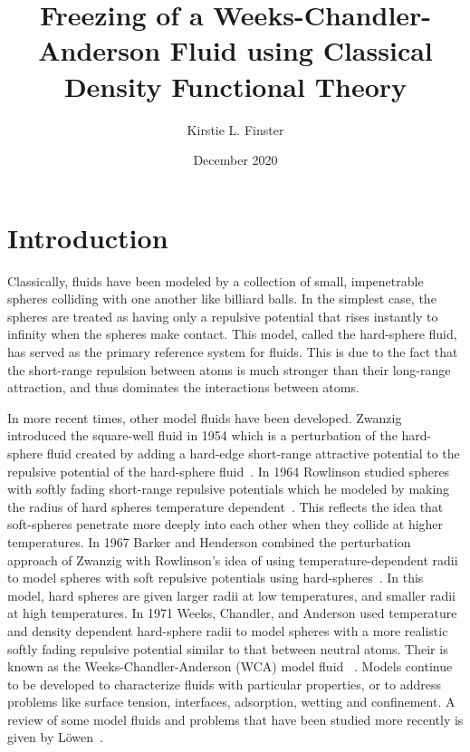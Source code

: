 \documentclass[double,12pt]{beavtex}
\title{Freezing of a Weeks-Chandler-Anderson Fluid using Classical Density Functional Theory}
\author{Kirstie L. Finster}
\date{December 2020}
\begin{document}
   \maketitle
   \mainmatter

\chapter{Introduction}

Classically, fluids have been modeled by a collection of small, 
impenetrable spheres colliding with one another like billiard balls. 
In the simplest case, the spheres are treated as having only a repulsive 
potential that rises instantly to infinity when the spheres make contact. 
This model, called the hard-sphere fluid, has served as the 
primary reference system for fluids. This is due to the fact that the 
short-range repulsion between atoms is much stronger than their long-range 
attraction, and thus dominates the interactions between atoms. 

In more recent times, other model fluids have been developed.
Zwanzig introduced the square-well 
fluid in 1954 which is a perturbation of the hard-sphere fluid created by adding 
a hard-edge short-range attractive potential to the repulsive potential of the 
hard-sphere fluid~\cite{ZwanzigSqrWell}. In 1964 Rowlinson studied 
spheres with softly fading short-range repulsive potentials which he modeled by making
the radius of hard spheres temperature dependent~\cite{rowlinson1964statistical}. 
This reflects the idea that soft-spheres penetrate more deeply into 
each other when they collide at higher temperatures. 
In 1967 Barker and Henderson combined the perturbation approach of Zwanzig 
with Rowlinson's idea of using temperature-dependent radii to model spheres 
with soft repulsive potentials using hard-spheres~\cite{barker1967perturbation}. 
In this model, 
hard spheres are given larger radii 
at low temperatures, and smaller radii at high temperatures. 
In 1971 Weeks, 
Chandler, and Anderson used temperature and density dependent hard-sphere 
radii to model spheres with a more realistic softly fading repulsive 
potential similar to that between neutral atoms.
Their is known as the Weeks-Chandler-Anderson (WCA) model fluid~\cite{andersen1971relationship} . 
Models continue to be developed to characterize fluids with particular 
properties, or to address problems like surface tension, 
interfaces, adsorption, wetting and confinement.
A review of some model fluids and problems that have been
studied more recently is given by L\"{o}wen~\cite{lowen}.
\end{document}
